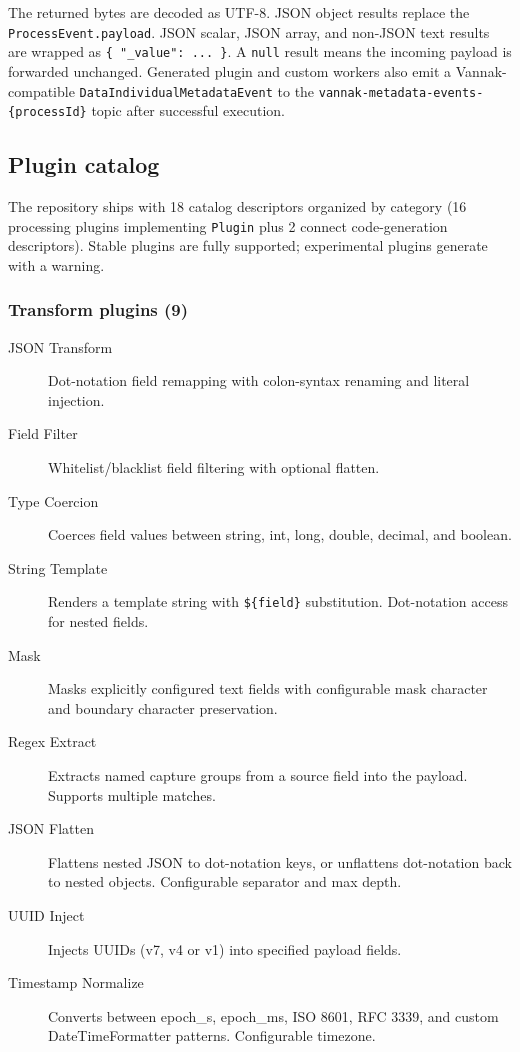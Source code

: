 The returned bytes are decoded as UTF-8. JSON object results replace the
\texttt{ProcessEvent.payload}. JSON scalar, JSON array, and non-JSON text results
are wrapped as \texttt{\{ "\_value": ... \}}. A \texttt{null} result means the
incoming payload is forwarded unchanged. Generated plugin and custom workers also
emit a Vannak-compatible \texttt{DataIndividualMetadataEvent} to the
\texttt{vannak-metadata-events-\{processId\}} topic after successful execution.

\subsection{Plugin catalog}

The repository ships with 18 catalog descriptors organized by category
(16 processing plugins implementing \texttt{Plugin} plus 2 connect code-generation
descriptors). Stable plugins are
fully supported; experimental plugins generate with a warning.

\subsubsection{Transform plugins (9)}

\begin{description}
\item[JSON Transform] Dot-notation field remapping with colon-syntax renaming and literal injection.
\item[Field Filter] Whitelist/blacklist field filtering with optional flatten.
\item[Type Coercion] Coerces field values between string, int, long, double, decimal, and boolean.
\item[String Template] Renders a template string with \texttt{\$\{field\}} substitution. Dot-notation access for nested fields.
\item[Mask] Masks explicitly configured text fields with configurable mask character and boundary character preservation.
\item[Regex Extract] Extracts named capture groups from a source field into the payload. Supports multiple matches.
\item[JSON Flatten] Flattens nested JSON to dot-notation keys, or unflattens dot-notation back to nested objects. Configurable separator and max depth.
\item[UUID Inject] Injects UUIDs (v7, v4 or v1) into specified payload fields.
\item[Timestamp Normalize] Converts between epoch\_s, epoch\_ms, ISO 8601, RFC 3339, and custom DateTimeFormatter patterns. Configurable timezone.
\end{description}

